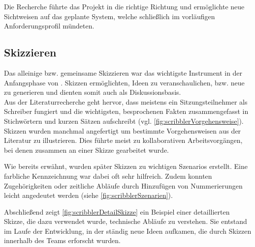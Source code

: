 \medskip Die Recherche führte das Projekt in die richtige Richtung und ermöglichte neue Sichtweisen auf das geplante System, welche schließlich im vorläufigen Anforderungsprofil mündeten.

\subsection{Skizzieren}
Das alleinige bzw. gemeinsame Skizzieren war das wichtigste Instrument in der Anfangsphase von \scribbler. Skizzen ermöglichten, Ideen zu veranschaulichen, bzw. neue zu generieren und dienten somit auch als Diskussionsbasis. \\
Aus der Literaturrecherche geht hervor, dass meistens ein Sitzungsteilnehmer als Schreiber fungiert und die wichtigsten, besprochenen Fakten zusammengefasst in Stichwörtern und kurzen Sätzen aufschreibt (vgl. \autoref{fig:scribblerVorgehensweise}). Skizzen wurden manchmal angefertigt um bestimmte Vorgehensweisen aus der Literatur zu illustrieren. Dies führte meist zu kollaborativen Arbeitsvorgängen, bei denen zusammen an einer Skizze gearbeitet wurde. 

\medskip Wie bereits erwähnt, wurden später Skizzen zu wichtigen Szenarios erstellt. Eine farbliche Kennzeichnung war dabei oft sehr hilfreich. Zudem konnten Zugehörigkeiten oder zeitliche Abläufe durch Hinzufügen von Nummerierungen leicht angedeutet werden (siehe \autoref{fig:scribblerSzenarien}).

\medskip Abschließend zeigt \autoref{fig:scribblerDetailSkizze} ein Beispiel einer detaillierten Skizze, die dazu verwendet wurde, technische Abläufe zu verstehen. Sie entstand im Laufe der Entwicklung, in der ständig neue Ideen aufkamen, die durch Skizzen innerhalb des Teams erforscht wurden.

